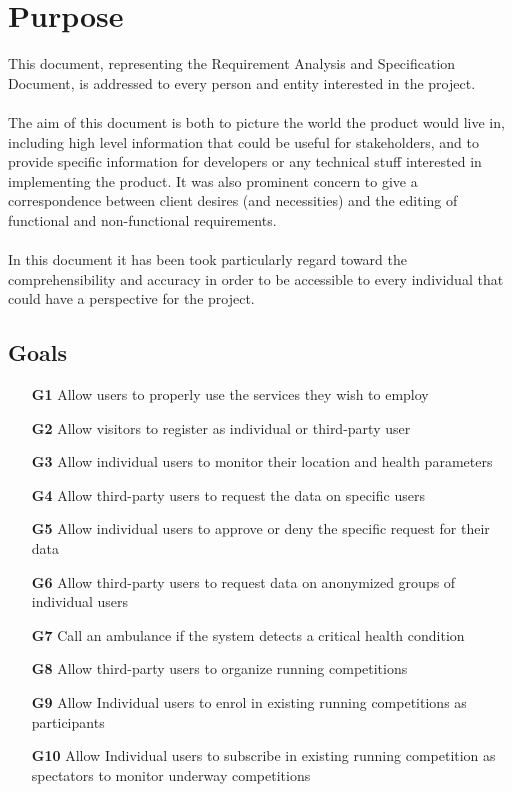 \section{Purpose}
This document, representing the Requirement Analysis and Specification Document, is addressed to every person and entity interested in the project.  \\
\\
The aim of this document is both to picture the world the product would live in, including high level information that could be useful for stakeholders, and to provide specific information for developers or any technical stuff interested in implementing the product. It was also prominent concern to give a correspondence between client desires (and necessities) and the editing of functional and non-functional requirements. \\
\\
In this document it has been took particularly regard toward the comprehensibility and accuracy in order to be accessible to every individual that could have a perspective for the project. 
\subsection{Goals}
\begin{itemize}
\item
[\textbf{G1}] Allow users to properly use the services they wish to employ
\item
[\textbf{G2}] Allow visitors to register as individual or third-party user
\item
[\textbf{G3}] Allow individual users to monitor their location and health parameters
\item
[\textbf{G4}] Allow third-party users to request the data on specific users
\item
[\textbf{G5}] Allow individual users to approve or deny the specific request for their data
\item
[\textbf{G6}] Allow third-party users to request data on anonymized groups of individual users
\item
[\textbf{G7}] Call an ambulance if the system detects a critical health condition
\item
[\textbf{G8}] Allow third-party users to organize running competitions
\item
[\textbf{G9}] Allow Individual users to enrol in existing running competitions as participants 
\item
[\textbf{G10}] Allow Individual users to subscribe in existing running competition as spectators to monitor underway competitions
\end{itemize}


